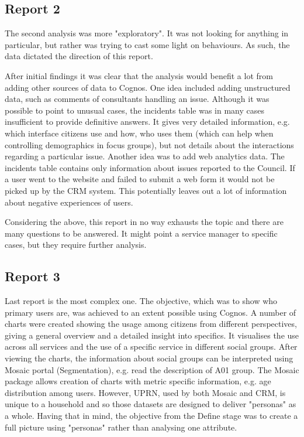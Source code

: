 		\subsection{Report 2}
		
The second analysis was more "exploratory". It was not looking for anything in particular, but rather was trying to cast some light on behaviours. As such, the data dictated the direction of this report.

After initial findings it was clear that the analysis would benefit a lot from adding other sources of data to Cognos. One idea included adding unstructured data, such as comments of consultants handling an issue. Although it was possible to point to unusual cases, the incidents table was in many cases insufficient to provide definitive answers. It gives very detailed information, e.g. which interface citizens use and how, who uses them (which can help when controlling demographics in focus groups), but not details about the interactions regarding a particular issue. Another idea was to add web analytics data. The incidents table contains only information about issues reported to the Council. If a user went to the website and failed to submit a web form it would not be picked up by the CRM system. This potentially leaves out a lot of information about negative experiences of users.

Considering the above, this report in no way exhausts the topic and there are many questions to be answered. It might point a service manager to specific cases, but they require further analysis.
		
		\subsection{Report 3}
		
Last report is the most complex one. The objective, which was to show who primary users are, was achieved to an extent possible using Cognos. A number of charts were created showing the usage among citizens from different perspectives, giving a general overview and a detailed insight into specifics. It visualises the use across all services and the use of a specific service in different social groups. After viewing the charts, the information about social groups can be interpreted using Mosaic portal (Segmentation), e.g. read the description of A01 group. The Mosaic package allows creation of charts with metric specific information, e.g. age distribution among users. However, UPRN, used by both Mosaic and CRM, is unique to a household and so those datasets are designed to deliver "personas" as a whole. Having that in mind, the objective from the Define stage was to create a full picture using "personas" rather than analysing one attribute.

